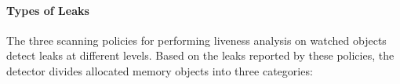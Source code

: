 \paragraph{Types of Leaks}
The three scanning policies for performing liveness analysis on watched objects detect leaks at different levels. Based on the leaks reported by these policies, the detector divides allocated memory objects into three categories:
